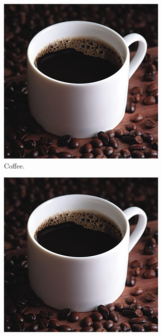 \begin{figure}[ht!]
	\centering
	\caption{The same cup of coffee. Multiple times.}
	\begin{subfigure}[b]{0.2\linewidth}
		\includegraphics[width=\linewidth]{2-textuais/figs/coffee.jpg}
		\caption{Coffee.}
	\end{subfigure}
	\begin{subfigure}[b]{0.2\linewidth}
		\includegraphics[width=\linewidth]{2-textuais/figs/coffee.jpg}

\end{subfigure}
\end{figure}
